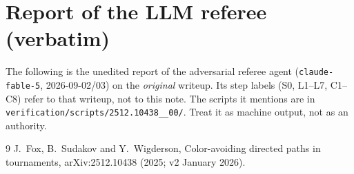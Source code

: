 \documentclass[11pt,a4paper]{article}
\theoremstyle{plain}
\theoremstyle{definition}
\theoremstyle{remark}
\begin{document}
\section{Report of the LLM referee (verbatim)}\label{app:referee}

\begin{tcolorbox}[colback=gray!8,colframe=gray!50,boxrule=0.4pt,arc=2pt]
\small The following is the unedited report of the adversarial referee agent (\texttt{claude-fable-5}, 2026-09-02/03) on the \emph{original} writeup. Its step labels (S0, L1--L7, C1--C8) refer to that writeup, not to this note. The scripts it mentions are in \texttt{verification/scripts/2512.10438\_\_00/}. Treat it as machine output, not as an authority.
\end{tcolorbox}



\begin{thebibliography}{9}
 J.~Fox, B.~Sudakov and Y.~Wigderson, Color-avoiding directed paths in tournaments, arXiv:2512.10438 (2025; v2 January 2026).
\end{thebibliography}
\end{document}
